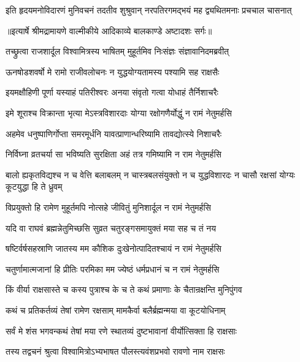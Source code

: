 \fourlineindentedshloka
{इति हृदयमनोविदारणं}
{ मुनिवचनं तदतीव शुश्रुवान्}
{नरपतिरगमद्भयं मह}
{द्व्यथितमनाः प्रचचाल चासनात्} %


{॥इत्यार्षे श्रीमद्रामायणे वाल्मीकीये आदिकाव्ये बालकाण्डे अष्टादशः सर्गः॥}


\twolineshloka
{तच्छ्रुत्वा राजशार्दूल विश्वामित्रस्य भाषितम्}
{मुहूर्तमिव निःसंज्ञः संज्ञावानिदमब्रवीत्} %

\twolineshloka
{ऊनषोडशवर्षो मे रामो राजीवलोचनः}
{न युद्धयोग्यतामस्य पश्यामि सह राक्षसैः} %

\twolineshloka
{इयमक्षौहिणी पूर्णा यस्याहं पतिरीश्वरः}
{अनया संवृतो गत्वा योधाहं तैर्निशाचरैः} %

\twolineshloka
{इमे शूराश्च विक्रान्ता भृत्या मेऽस्त्रविशारदाः}
{योग्या रक्षोगणैर्योद्धुं न रामं नेतुमर्हसि} %

\twolineshloka
{अहमेव धनुष्पाणिर्गोप्ता समरमूर्धनि}
{यावत्प्राणान्धरिष्यामि तावद्योत्स्ये निशाचरैः} %

\twolineshloka
{निर्विघ्ना व्रतचर्या सा भविष्यति सुरक्षिता}
{अहं तत्र गमिष्यामि न राम नेतुमर्हसि} %

\threelineshloka
{बालो ह्यकृतविद्यश्च न च वेत्ति बलाबलम्}
{न चास्त्रबलसंयुक्तो न च युद्धविशारदः}
{न चासौ रक्षसां योग्यः कूटयुद्धा हि ते ध्रुवम्} %

\twolineshloka
{विप्रयुक्तो हि रामेण मुहूर्तमपि नोत्सहे}
{जीवितुं मुनिशार्दूल न रामं नेतुमर्हसि} %

\twolineshloka
{यदि वा राघवं ब्रह्मन्नेतुमिच्छसि सुव्रत}
{चतुरङ्गसमायुक्तं मया सह च तं नय} %

\twolineshloka
{षष्टिर्वर्षसहस्राणि जातस्य मम कौशिक}
{दुःखेनोत्पादितश्चायं न रामं नेतुमर्हसि} %

\twolineshloka
{चतुर्णामात्मजानां हि प्रीतिः परमिका मम}
{ज्येष्ठं धर्मप्रधानं च न रामं नेतुमर्हसि} %

\twolineshloka
{किं वीर्या राक्षसास्ते च कस्य पुत्राश्च के च ते}
{कथं प्रमाणाः के चैतान्रक्षन्ति मुनिपुंगव} %

\twolineshloka
{कथं च प्रतिकर्तव्यं तेषां रामेण रक्षसाम्}
{मामकैर्वा बलैर्ब्रह्मन्मया वा कूटयोधिनाम्} %

\twolineshloka
{सर्वं मे शंस भगवन्कथं तेषां मया रणे}
{स्थातव्यं दुष्टभावानां वीर्योत्सिक्ता हि राक्षसाः} %

\twolineshloka
{तस्य तद्वचनं श्रुत्वा विश्वामित्रोऽभ्यभाषत}
{पौलस्त्यवंशप्रभवो रावणो नाम राक्षसः} %

